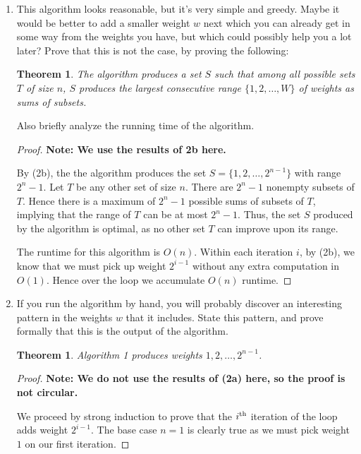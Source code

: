 \documentclass[10pt]{article}
\newtheorem{theorem}[lemma]{Theorem}
\providecommand{\Kth}[1]{\ensuremath{{#1}^{\rm th}}}
\begin{document}
\begin{enumerate}
\item This algorithm looks reasonable, but it's very simple and greedy. Maybe it would be better to add a smaller weight $w$ next which you can already get in some way from the weights you have, but which could possibly help you a lot later? Prove that this is not the case, by proving the following:

\begin{theorem}
  The algorithm produces a set $S$ such that among all possible sets $T$ of size $n$, $S$ produces the largest consecutive range $\{1, 2, \ldots, W\}$ of weights as sums of subsets.
\end{theorem}

Also briefly analyze the running time of the algorithm.

\begin{proof}
  \textbf{Note: We use the results of 2b here.}
  
  By (2b), the the algorithm produces the set \(S = \{1, 2, \dots, 2^{n - 1}\}\) with range \(2^n - 1\). Let \(T\) be any other set of size \(n\). There are \(2^n - 1\) nonempty subsets of \(T\). Hence there is a maximum of \(2^n - 1\) possible sums of subsets of \(T\), implying that the range of \(T\) can be at most \(2^n - 1\). Thus, the set \(S\) produced by the algorithm is optimal, as no other set \(T\) can improve upon its range. 

  The runtime for this algorithm is \(O(n)\). Within each iteration \(i\), by (2b), we know that we must pick up weight \(2^{i - 1}\) without any extra computation in \(O(1)\). Hence over the loop we accumulate \(O(n)\) runtime.
\end{proof}

\item If you run the algorithm by hand, you will probably discover an interesting pattern in the weights $w$ that it includes. State this pattern, and prove formally that this is the output of the algorithm.

\begin{theorem}
  Algorithm 1 produces weights \(1, 2, \dots, 2^{n - 1}\).
\end{theorem}

\begin{proof}
  \textbf{Note: We do not use the results of (2a) here, so the proof is not circular.}

  We proceed by strong induction to prove that the \Kth{i} iteration of the loop adds weight \(2^{i - 1}\). The base case \(n = 1\) is clearly true as we must pick weight \(1\) on our first iteration. 


\end{proof}
\end{enumerate}
\end{document}
